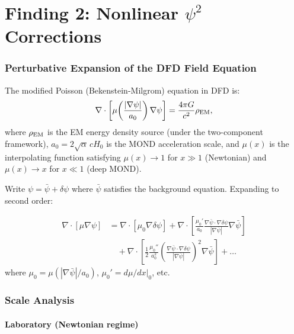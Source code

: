 \documentclass[11pt]{article}
\begin{document}
\part{Finding 2: Nonlinear $\psi^2$ Corrections}
\label{part:nonlinear}

\section{Perturbative Expansion of the DFD Field Equation}

The modified Poisson (Bekenstein-Milgrom) equation in DFD is:
\begin{equation}
\nabla \cdot \left[\mu\!\left(\frac{|\nabla\psi|}{a_0}\right)
\nabla\psi\right] = \frac{4\pi G}{c^2}\rho_{\rm EM},
\end{equation}
where $\rho_{\rm EM}$ is the EM energy density source (under the
two-component framework), $a_0 = 2\sqrt{\alpha}\,cH_0$ is the MOND
acceleration scale, and $\mu(x)$ is the interpolating function satisfying
$\mu(x) \to 1$ for $x \gg 1$ (Newtonian) and $\mu(x) \to x$ for
$x \ll 1$ (deep MOND).

Write $\psi = \bar{\psi} + \delta\psi$ where $\bar{\psi}$ satisfies
the background equation. Expanding to second order:

\begin{align}
\nabla \cdot [\mu \nabla \psi] &= \nabla \cdot [\mu_0 \nabla\delta\psi]
+ \nabla \cdot \left[\frac{\mu_0'}{a_0} \frac{\nabla\bar{\psi}
\cdot \nabla\delta\psi}{|\nabla\bar{\psi}|} \nabla\bar{\psi}\right]
\nonumber \\
&\quad + \nabla \cdot \left[\frac{1}{2}\frac{\mu_0''}{a_0^2}
\left(\frac{\nabla\bar{\psi} \cdot \nabla\delta\psi}{|\nabla\bar{\psi}|}\right)^2
\nabla\bar{\psi}\right] + \ldots
\end{align}
where $\mu_0 = \mu(|\nabla\bar{\psi}|/a_0)$, $\mu_0' = d\mu/dx|_0$, etc.

\section{Scale Analysis}

\subsection{Laboratory (Newtonian regime)}
\end{document}
